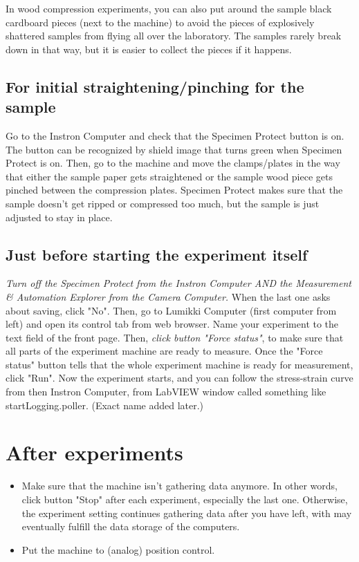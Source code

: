 \documentclass[a4paper]{article}
\begin{document}
In wood compression experiments, you can also put around the sample black cardboard
pieces (next to the machine) to avoid the pieces of explosively shattered samples
from flying all over the laboratory. The samples rarely break down in that way,
but it is easier to collect the pieces if it happens.

\subsection{For initial straightening/pinching for the sample} 

Go to the Instron Computer and check that the Specimen Protect button is on. 
The button can be recognized by shield image that turns green when Specimen 
Protect is on. Then, go to the machine and move the clamps/plates in the way 
that either the sample paper gets straightened or the sample wood piece gets 
pinched between the compression plates. Specimen Protect makes sure that the 
sample doesn't get ripped or compressed too much, but the sample is just 
adjusted to stay in place.

\subsection{Just before starting the experiment itself} 
\textit{Turn off the Specimen Protect from the Instron Computer AND the Measurement 
\& Automation Explorer from the Camera Computer.} When the last one asks about 
saving, click "No". Then, go to Lumikki Computer (first computer from left) and 
open its control tab from web browser. Name your experiment to the text field of 
the front page. Then, \textit{click button "Force status"}, to make sure that all 
parts of the experiment machine are ready to measure. Once the "Force status" 
button tells that the whole experiment machine is ready for measurement, click "Run".
Now the experiment starts, and you can follow the stress-strain curve from then
Instron Computer, from LabVIEW  window called something like startLogging.poller.
(Exact name added later.)

\section{After experiments}

\begin{itemize}
  \item Make sure that the machine isn't gathering data anymore. In other words, click button "Stop" after each experiment, especially the last one. Otherwise, the experiment setting continues gathering data after you have left, with may eventually fulfill the data storage of the computers.
  \item Put the machine to (analog) position control.
\end{itemize}
\end{document}
